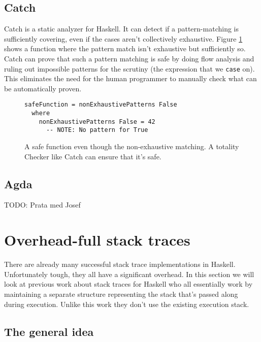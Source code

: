 \subsection{Catch}

Catch is a static analyzer for Haskell. It can detect if a pattern-matching is
sufficiently covering, even if the cases aren't collectively exhaustive. Figure
\ref{fig:catch_example} shows a function where the pattern match isn't exhaustive but
sufficiently so.
Catch can prove that such a pattern
matching is safe by doing flow analysis and ruling out impossible
patterns for the scrutiny (the expression that we \texttt{case} on). %
This eliminates the need for the human programmer to manually check what can be
automatically proven. \cite{mitchell:catch_2008_9_25}

\begin{figure}
      \begin{verbatim}
safeFunction = nonExhaustivePatterns False
  where
    nonExhaustivePatterns False = 42
      -- NOTE: No pattern for True
      \end{verbatim}
      \caption{A safe function even though the non-exhaustive matching. A
        totality Checker like Catch can ensure that it's safe.}
      \label{fig:catch_example}
\end{figure}

\subsection{Agda}

TODO: Prata med Josef

\section{Overhead-full stack traces} \label{sec:overhead_full}

There are already many successful stack trace implementations in
Haskell. Unfortunately tough, they all have a significant overhead.
In this section we will look at previous work about stack traces for
Haskell who all essentially work by maintaining a separate structure
representing the stack that's passed along during execution. Unlike this
work they don't use the existing execution stack.

\subsection{The general idea}

